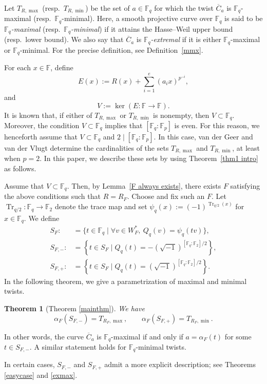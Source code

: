 \documentclass[12pt,a4paper]{amsart}
\newtheorem{theorem}{Theorem}[section]
\theoremstyle{definition}
\def\F{{\mathbb F}}
\theoremstyle{remark}
\DeclareMathOperator{\Tr}{Tr}
\begin{document}
Let $T_{R,\max}$ (resp.\ $T_{R,\min}$) be the set of 
$a \in \F_q$ for which 
the twist $\overline{C}_{a}$ is 
$\F_q$-maximal (resp.\ $\F_q$-minimal). Here, a smooth projective curve over $\F_q$ is said to be \emph{$\F_q$-maximal} (resp.\ \emph{$\F_q$-minimal}) if it attains the Hasse--Weil upper bound (resp.\ lower bound). We also say that $\overline{C}_a$ is \emph{$\F_q$-extremal} if it is either $\F_q$-maximal or $\F_q$-minimal. 
For the precise definition, see Definition~\ref{mmx}. 

For each $x\in \F$, define 
\[
E(x):=R(x)+\sum_{i=1}^e(a_ix)^{p^{-i}}, 
\]
and 
\[V:=\ker(E\colon \F\to \F). \]
It is known that, if either of $T_{R,\max}$ or $T_{R,\min}$ is nonempty, then $V\subset \F_q$. Moreover, the condition $V\subset\F_q$ implies that $[\F_q:\F_p]$ is even. 
For this reason, we henceforth assume that $V\subset \F_q$ and $2\mid[\F_q:\F_p]$. In this case, van der Geer and van der Vlugt \cite[(6.2)]{GV} determine the cardinalities of the sets $T_{R,\max}$ and $T_{R,\min}$, at least when $p=2$. In this paper, we describe these sets by using Theorem~\ref{thm1 intro} as follows. 

Assume that $V\subset\F_q$. Then, by Lemma~\ref{F always exists}, there exists $F$ satisfying the above conditions such that $R=R_F$. Choose and fix such an $F$. 
Let $\Tr_{q/2} \colon \F_q \to \F_2$ denote the trace map and set 
$\psi_q(x):=(-1)^{\Tr_{q/2}(x)}$ for $x \in \F_q$. 
We define 
\begin{align*}
S_{F}:&=\{t \in \F_q \mid \forall v \in W_F^\ast,\ Q_q(v)=\psi_q(tv)\}, \\
S_{F,-}:&=\left\{t \in S_F \mid Q_q(t)=-(\sqrt{-1})^{[\F_q:\F_2]/2}\right\}, \\
S_{F,+}:&=\left\{t \in S_F \mid Q_q(t)=(\sqrt{-1})^{[\F_q:\F_2]/2}\right\}. 
\end{align*}
In the following theorem,
we give a parametrization of maximal and minimal twists.

\begin{theorem}[Theorem \ref{mainthm}]\label{mainthm intro}
We have
\[
\alpha_F(S_{F,-}) = T_{R_F,\max}, \qquad \alpha_F(S_{F,+}) = T_{R_F,\min}. 
\]
\end{theorem}

In other words, the curve $\overline{C}_a$ is $\F_q$-maximal if and only if $a=\alpha_F(t)$ for some $t\in S_{F,-}$. A similar statement holds for $\F_q$-minimal twists. 

In certain cases, $S_{F,-}$ and $S_{F,+}$ admit a more explicit description; see Theorems \ref{easycase} and \ref{exmax}.
\end{document}
